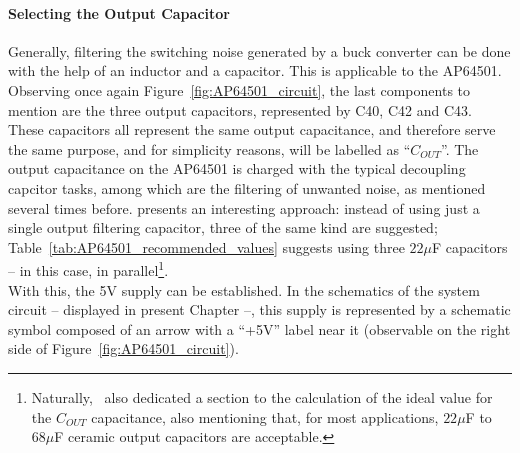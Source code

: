 \paragraph{Selecting the Output Capacitor}	Generally, filtering the switching noise generated by a buck converter can be done with the help of an inductor and a capacitor.
This is applicable to the AP64501.
Observing once again Figure~\ref{fig:AP64501_circuit}, the last components to mention are the three output capacitors, represented by C40, C42 and C43. These capacitors all represent the same output capacitance, and therefore serve the same purpose, and for simplicity reasons, will be labelled as ``$C_{OUT}$''. The output capacitance on the AP64501 is charged with the typical decoupling capcitor tasks, among which are the filtering of unwanted noise, as mentioned several times before.
\cite{AP64501} presents an interesting approach: instead of using just a single output filtering capacitor, three of the same kind are suggested; Table~\ref{tab:AP64501_recommended_values} suggests using three $22 \mu$F capacitors -- in this case, in parallel\footnote[13]{Naturally,~\cite{AP64501} also dedicated a section to the calculation of the ideal value for the $C_{OUT}$ capacitance, also mentioning that, for most applications, $22 \mu$F to $68 \mu$F ceramic output capacitors are acceptable.}.\\

With this, the 5V supply can be established. In the schematics of the system circuit -- displayed in present Chapter --, this supply is represented by a schematic symbol composed of an arrow with a ``+5V'' label near it (observable on the right side of Figure~\ref{fig:AP64501_circuit}).





